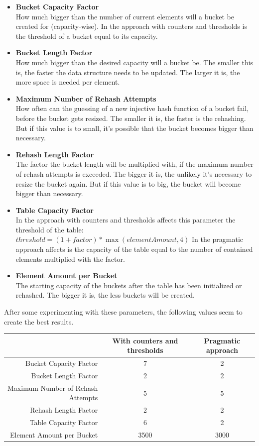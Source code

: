 \documentclass{article}
\begin{document}
\begin{itemize}
  \item \textbf{Bucket Capacity Factor}\\
  	How much bigger than the number of current elements will a bucket be created for (capacity-wise). In the approach with counters and thresholds is the threshold of a bucket equal to its capacity.
  \item \textbf{Bucket Length Factor}\\
    How much bigger than the desired capacity will a bucket be. The smaller this is, the faster the data structure needs to be updated. The larger it is, the more space is needed per element.
  \item \textbf{Maximum Number of Rehash Attempts}\\
  	How often can the guessing of a new injective hash function of a bucket fail, before the bucket gets resized. The smaller it is, the faster is the rehashing. But if this value is to small, it's possible that the bucket becomes bigger than necessary.
  \item \textbf{Rehash Length Factor}\\
    The factor the bucket length will be multiplied with, if the maximum number of rehash attempts is exceeded. The bigger it is, the unlikely it's necessary to resize the bucket again. But if this value is to big, the bucket will become bigger than necessary.
  \item \textbf{Table Capacity Factor}\\
    In the approach with counters and thresholds affects this parameter the threshold of the table: $ threshold = (1 + factor) * \max(elementAmount, 4) $
    In the pragmatic approach affects is the capacity of the table equal to the number of contained elements multiplied with the factor.
  \item \textbf{Element Amount per Bucket}\\
    The starting capacity of the buckets after the table has been initialized or rehashed. The bigger it is, the less buckets will be created.
\end{itemize}

After some experimenting with these parameters, the following values seem to create the best results.

\begin{tabulary}{\textwidth}{R|C|C}
& With counters \newline and thresholds & Pragmatic approach \\ 
\hline Bucket Capacity Factor & 7 & 2 \\ 
\hline Bucket Length Factor & 2 & 2 \\ 
\hline Maximum Number of Rehash Attempts & 5 & 5 \\ 
\hline Rehash Length Factor & 2 & 2 \\ 
\hline Table Capacity Factor & 6 & 2 \\ 
\hline Element Amount per Bucket & 3500 & 3000 \\
\end{tabulary} 
\end{document}
